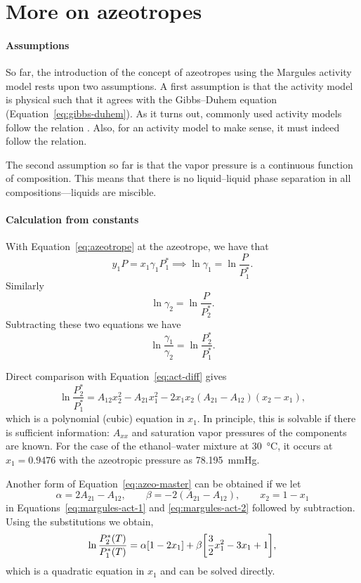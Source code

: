 \section{More on azeotropes}

\paragraph{Assumptions}
So far, the introduction of the concept of azeotropes using the Margules
activity model rests upon two assumptions. A first assumption is that the
activity model is physical such that it agrees with the Gibbs--Duhem equation
(Equation~\ref{eq:gibbs-duhem}). As it turns out, commonly used activity 
models follow the relation \cite[p.~440]{enggbook}. Also, for an
activity model to make sense, it must indeed follow the relation.

The second assumption so far is that the vapor pressure is a continuous function
of composition. This means that there is no liquid--liquid phase separation
in all compositions---liquids are miscible.

\paragraph{Calculation from constants}
With Equation~\ref{eq:azeotrope} at the azeotrope, we have that
\[
    y_1P = x_1\gamma_1P_1^* \implies \ln\gamma_1 = \ln \dfrac{P}{P_1^*}.
\]
Similarly
\[
    \ln\gamma_2 = \ln \dfrac{P}{P_2^*}.
\]
Subtracting these two equations we have
\begin{equation}\label{eq:act-diff2}
    \ln \dfrac{\gamma_1}{\gamma_2} = \ln \dfrac{P_2^*}{P_1^*}.
\end{equation}

Direct comparison with Equation~\ref{eq:act-diff} gives
\begin{equation}\label{eq:azeo-master}
    \ln \dfrac{P_2^*}{P_1^*} = A_{12}x_2^2 - A_{21}x_1^2 - 2x_1x_2
    (A_{21} - A_{12})(x_2 - x_1),
\end{equation}
which is a polynomial (cubic) equation in $x_1$. In principle, this is
solvable if there is sufficient information: $A_{xx}$ and
saturation vapor pressures of the components are known. For the case of
the ethanol--water mixture at \SI{30}{\celsius}, it occurs at $x_1 = 0.9476$
with the azeotropic pressure as \SI{78.195}{\mmHg}.

Another form of Equation~\ref{eq:azeo-master} can be obtained if we let
\[
    \alpha = 2A_{21} - A_{12},\qquad \beta = -2(A_{21} - A_{12}),\qquad
    x_2 = 1 - x_1
\]
in Equations~\ref{eq:margules-act-1} and \ref{eq:margules-act-2} followed by
subtraction. Using the substitutions we obtain,
\begin{equation}\label{eq:azeo-master2}
    \ln \dfrac{P_2^*(T)}{P_1^*(T)} = \alpha[1 - 2x_1] + \beta\qty[\frac32 x_1^2
    -3x_1 + 1],
\end{equation}
which is a quadratic equation in $x_1$ and can be solved directly.

